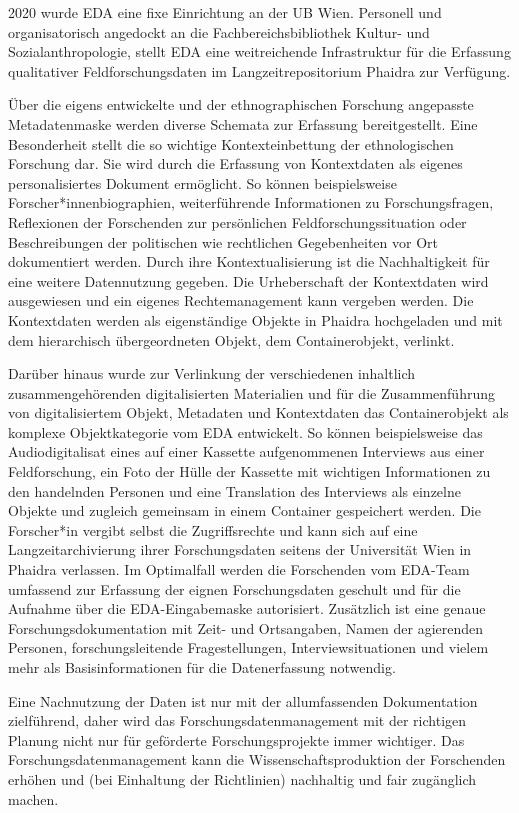 \documentclass[a4paper,
fontsize=11pt,
oneside,
numbers=noperiodatend,
parskip=half-,
bibliography=totoc,
final
]{scrartcl}
\begin{document}
2020 wurde EDA eine fixe Einrichtung an der UB Wien. Personell und
organisatorisch angedockt an die Fachbereichsbibliothek Kultur- und
Sozialanthropologie, stellt EDA eine weitreichende Infrastruktur für die
Erfassung qualitativer Feldforschungsdaten im Langzeitrepositorium
Phaidra zur Verfügung.

Über die eigens entwickelte und der ethnographischen Forschung
angepasste Metadatenmaske werden diverse Schemata zur Erfassung
bereitgestellt. Eine Besonderheit stellt die so wichtige
Kontexteinbettung der ethnologischen Forschung dar. Sie wird durch die
Erfassung von Kontextdaten als eigenes personalisiertes Dokument
ermöglicht. So können beispielsweise Forscher*innenbiographien,
weiterführende Informationen zu Forschungsfragen, Reflexionen der
Forschenden zur persönlichen Feldforschungssituation oder Beschreibungen
der politischen wie rechtlichen Gegebenheiten vor Ort dokumentiert
werden. Durch ihre Kontextualisierung ist die Nachhaltigkeit für eine
weitere Datennutzung gegeben. Die Urheberschaft der Kontextdaten wird
ausgewiesen und ein eigenes Rechtemanagement kann vergeben werden. Die
Kontextdaten werden als eigenständige Objekte in Phaidra hochgeladen und
mit dem hierarchisch übergeordneten Objekt, dem Containerobjekt,
verlinkt.

Darüber hinaus wurde zur Verlinkung der verschiedenen inhaltlich
zusammengehörenden digitalisierten Materialien und für die
Zusammenführung von digitalisiertem Objekt, Metadaten und Kontextdaten
das Containerobjekt als komplexe Objektkategorie vom EDA entwickelt. So
können beispielsweise das Audiodigitalisat eines auf einer Kassette
aufgenommenen Interviews aus einer Feldforschung, ein Foto der Hülle der
Kassette mit wichtigen Informationen zu den handelnden Personen und eine
Translation des Interviews als einzelne Objekte und zugleich gemeinsam
in einem Container gespeichert werden. Die Forscher*in vergibt selbst
die Zugriffsrechte und kann sich auf eine Langzeitarchivierung ihrer
Forschungsdaten seitens der Universität Wien in Phaidra verlassen. Im
Optimalfall werden die Forschenden vom EDA-Team umfassend zur Erfassung
der eignen Forschungsdaten geschult und für die Aufnahme über die
EDA-Eingabemaske autorisiert. Zusätzlich ist eine genaue
Forschungsdokumentation mit Zeit- und Ortsangaben, Namen der agierenden
Personen, forschungsleitende Fragestellungen, Interviewsituationen und
vielem mehr als Basisinformationen für die Datenerfassung notwendig.

Eine Nachnutzung der Daten ist nur mit der allumfassenden Dokumentation
zielführend, daher wird das Forschungsdatenmanagement mit der richtigen
Planung nicht nur für geförderte Forschungsprojekte immer wichtiger. Das
Forschungsdatenmanagement kann die Wissenschaftsproduktion der
Forschenden erhöhen und (bei Einhaltung der Richtlinien) nachhaltig und
fair zugänglich machen.
\end{document}
